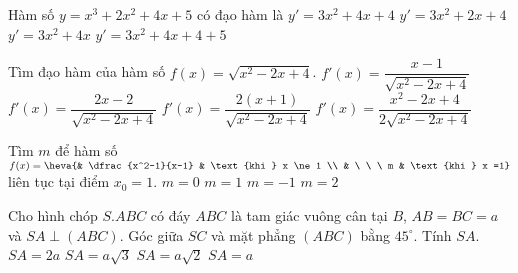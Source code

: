 \begin{ex}%
	Hàm số $y=x^3+2x^2+4x+5$ có đạo hàm là
	\choice
	{\True $y'=3x^2+4x+4$}
	{$y'=3x^2+2x+4$}
	{$y'=3x^2+4x$}
	{$y'=3x^2+4x+4+5$}
	
\end{ex}

\begin{ex}%
	Tìm đạo hàm của hàm số $f(x)=\sqrt{x^2-2x+4}$.
	\choice
	{\True $f'(x) = \dfrac{x-1}{\sqrt{x^2-2x+4}}$}
	{$f'(x) = \dfrac{2x-2}{\sqrt{x^2-2x+4}}$}
	{$f'(x) = \dfrac{2(x+1)}{\sqrt{x^2-2x+4}}$ }
	{$f'(x) = \dfrac{x^2-2x+4}{2\sqrt{x^2-2x+4}}$}
\end{ex}

\begin{ex}%
	Tìm $m$ để hàm số $f(x)=\heva{& \dfrac{x^2-1}{x-1} & \text{khi }  x \ne 1 \\ & \ \ \ m & \text{khi }  x =1}$ liên tục tại điểm $x_0=1$.
	\choice
	{$m=0$}
	{$m=1$}
	{$m=-1$}
	{\True $m=2$}
\end{ex}

\begin{ex}%
	Cho hình chóp $S.ABC$ có đáy $ABC$ là tam giác vuông cân tại $B$, $AB=BC=a$ và $SA \perp (ABC)$. Góc giữa $SC$ và mặt phẳng $(ABC)$ bằng $45^\circ$. Tính $SA$.
	\choice
	{$SA=2a$}
	{$SA=a \sqrt{3}$}
	{\True $SA=a \sqrt{2}$}
	{$SA=a$}
\end{ex}

